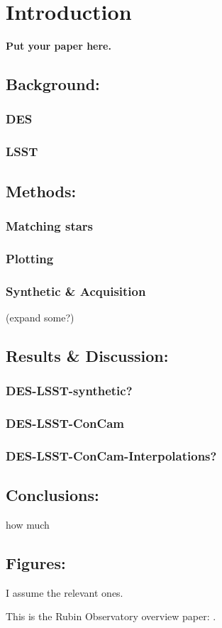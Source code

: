 \section{Introduction}

\textbf{Put your paper here.}

\subsection{Background:}
\subsubsection{DES}
\subsubsection{LSST}

\subsection{Methods:} 
\subsubsection{Matching stars}
\subsubsection{Plotting}
\subsubsection{Synthetic \& Acquisition}
(expand some?)


\subsection{Results \& Discussion:} 
\subsubsection{DES-LSST-synthetic?}
\subsubsection{DES-LSST-ConCam}
\subsubsection{DES-LSST-ConCam-Interpolations?}

\subsection{Conclusions:} how much

\subsection{Figures:} I assume the relevant ones.


\vskip 0.4in



This is the Rubin Observatory overview paper: \citet{2019ApJ...873..111I}.
